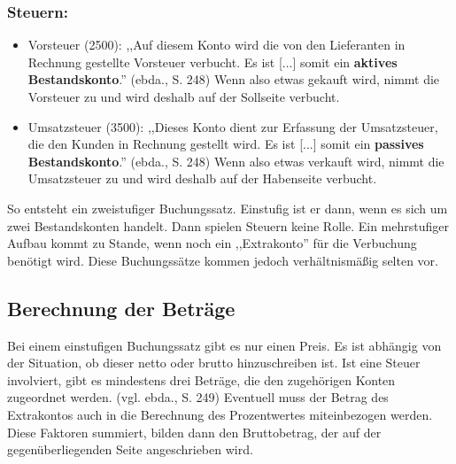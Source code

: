 \documentclass[12pt]{report}
\begin{document}
\subsubsection{Steuern:}
\begin{itemize}
	\item Vorsteuer (2500):
	      ,,Auf diesem Konto wird die von den Lieferanten in Rechnung gestellte Vorsteuer verbucht.
	      Es ist [...] somit ein \textbf{aktives Bestandskonto}.'' (ebda., S. 248\nocite{RW1}) Wenn also etwas gekauft wird, nimmt die Vorsteuer zu und wird deshalb auf der Sollseite verbucht.
	\item Umsatzsteuer (3500):
	      ,,Dieses Konto dient zur Erfassung der Umsatzsteuer, die den Kunden in Rechnung gestellt wird.
	      Es ist [...] somit ein \textbf{passives Bestandskonto}.'' (ebda., S. 248\nocite{RW1}) Wenn also etwas verkauft wird, nimmt die Umsatzsteuer zu und wird deshalb auf der Habenseite verbucht.
\end{itemize}



\noindent So entsteht ein zweistufiger Buchungssatz. Einstufig ist er dann, wenn es sich um zwei Bestandskonten handelt. Dann spielen Steuern keine Rolle. Ein mehrstufiger Aufbau kommt zu Stande, wenn noch ein ,,Extrakonto'' für die Verbuchung benötigt wird. Diese Buchungssätze kommen jedoch verhältnismäßig selten vor.

\subsection{Berechnung der Beträge}
Bei einem einstufigen Buchungssatz gibt es nur einen Preis. Es ist abhängig von der Situation, ob dieser netto oder brutto hinzuschreiben ist. Ist eine Steuer involviert, gibt es mindestens drei Beträge, die den zugehörigen Konten zugeordnet werden. (vgl. ebda., S. 249\nocite{RW1}) Eventuell muss der Betrag des Extrakontos auch in die Berechnung des Prozentwertes miteinbezogen werden. Diese Faktoren summiert, bilden dann den Bruttobetrag, der auf der gegenüberliegenden Seite angeschrieben wird.
 
\end{document}
